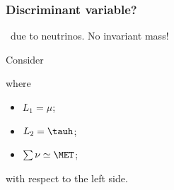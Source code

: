 \begin{frame}
\frametitle{Discriminant variable?}

\begin{minipage}[t]{.45\textwidth}
\manip \MET\ due to neutrinos.
\submanip No invariant mass!

\vspace{\baselineskip}

\begin{center}

\end{center}

\end{minipage}
\hfill\pause
\begin{minipage}[t]{.45\textwidth}
\manip Consider

\vspace{-\baselineskip}

\begin{center}

\end{center}

\vspace{-2\baselineskip}

where
\begin{itemize}
\item $L_1 = \mu$;
\item $L_2 = \tauh$;
\item $\sum\nu\simeq\MET$;
\end{itemize}
with respect to the left side.
\end{minipage}

\end{frame}

